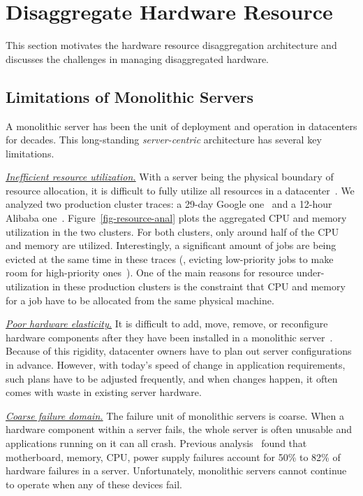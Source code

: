 \section{Disaggregate Hardware Resource}
\label{sec:lego:motivation}

This section
motivates the hardware resource disaggregation architecture
and discusses the challenges in managing disaggregated hardware.

\subsection{Limitations of Monolithic Servers}
\label{sec:lego:monolimit}
A monolithic server has been the unit of deployment and operation in datacenters for decades.
This long-standing {\em server-centric} architecture has several key limitations.

\textit{\uline{Inefficient resource utilization.}}
With a server being the physical boundary of resource allocation, 
it is difficult to fully utilize all resources in a datacenter~\cite{Barroso-COMPUTER,Quasar-ASPLOS,PowerNap}.
We analyzed two production cluster traces: a 29-day Google one~\cite{GoogleTrace}
and a 12-hour Alibaba one~\cite{AliTrace}.
Figure~\ref{fig-resource-anal} plots the aggregated CPU and memory utilization in the two clusters.
For both clusters, only around half of the CPU and memory are utilized.
Interestingly,
a significant amount of jobs are being evicted at the same time in these traces
(\eg, evicting low-priority jobs to make room for high-priority ones~\cite{Borg}).
One of the main reasons for resource under-utilization in these production clusters is 
the constraint that CPU and memory for a job have to be allocated from 
the same physical machine.



\textit{\uline{Poor hardware elasticity.}}
It is difficult to add, move, remove, or reconfigure hardware components
after they have been installed in a monolithic server~\cite{FB-Wedge100}. %
Because of this rigidity, datacenter owners have to plan out server configurations in advance.
However, with today's speed of change in application requirements, such plans have to be adjusted frequently,
and when changes happen, it often comes with waste in existing server hardware.

\textit{\uline{Coarse failure domain.}}
The failure unit of monolithic servers is coarse.
When a hardware component within a server fails, %
the whole server is often unusable and applications running on it can all crash.
Previous analysis~\cite{Failure-Disk-FAST07} found that motherboard, memory, CPU, power supply failures account for 
50\% to 82\% of hardware failures in a server.
Unfortunately, monolithic servers cannot continue to operate when any of these devices fail.

